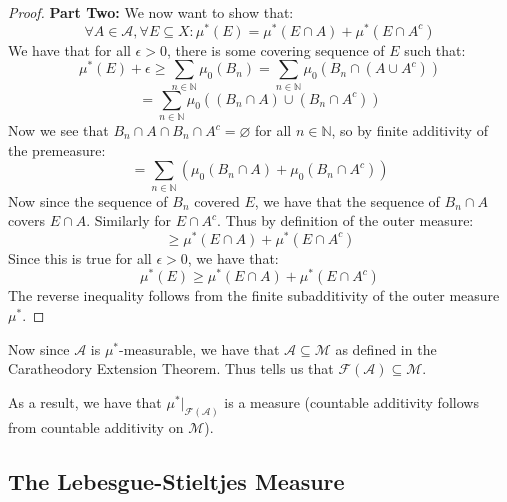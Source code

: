 \documentclass[10pt,letterpaper]{article} %
\begin{document}
\begin{proof}
\textbf{Part Two:} We now want to show that:
\begin{equation*}
\forall A \in \mathcal{A}, \forall E \subseteq X: \mu^*(E) = \mu^*(E \cap A) + \mu^*(E \cap A^c)
\end{equation*}
We have that for all $\epsilon > 0$, there is some covering sequence of $E$ such that:
\begin{equation*}
\mu^*(E) + \epsilon \geqslant \sum_{n \in \mathbb{N}}\mu_0(B_n) = \sum_{n \in \mathbb{N}}\mu_0(B_n \cap (A \cup A^c))
\end{equation*}
\begin{equation*}
= \sum_{n \in \mathbb{N}}\mu_0((B_n \cap A) \cup (B_n \cap A^c))
\end{equation*}
Now we see that $B_n \cap A \cap B_n \cap A^c = \varnothing$ for all $n \in \mathbb{N}$, so by finite additivity of the premeasure:
\begin{equation*}
= \sum_{n \in \mathbb{N}}(\mu_0(B_n \cap A) + \mu_0(B_n \cap A^c))
\end{equation*}
Now since the sequence of $B_n$ covered $E$, we have that the sequence of $B_n \cap A$ covers $E \cap A$. Similarly for $E \cap A^c$. Thus by definition of the outer measure:
\begin{equation*}
\geqslant \mu^*(E \cap A) + \mu^*(E \cap A^c)
\end{equation*}
Since this is true for all $\epsilon > 0$, we have that:
\begin{equation*}
\mu^*(E) \geqslant \mu^*(E \cap A) + \mu^*(E \cap A^c)
\end{equation*}
The reverse inequality follows from the finite subadditivity of the outer measure $\mu^*$.
\end{proof}

Now since $\mathcal{A}$ is $\mu^*$-measurable, we have that $\mathcal{A} \subseteq \mathcal{M}$ as defined in the Caratheodory Extension Theorem. Thus tells us that $\mathcal{F}(\mathcal{A}) \subseteq \mathcal{M}$.

As a result, we have that $\mu^*|_{\mathcal{F}(\mathcal{A})}$ is a measure (countable additivity follows from countable additivity on $\mathcal{M}$).

\pagebreak
\subsection{The Lebesgue-Stieltjes Measure}
\end{document}
